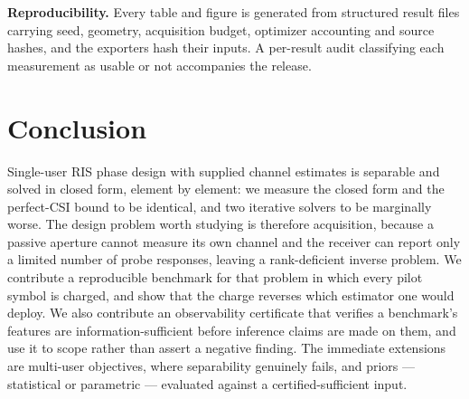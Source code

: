 \documentclass[journal]{IEEEtran}
\begin{document}
\textbf{Reproducibility.} Every table and figure is generated from structured result files carrying seed, geometry, acquisition budget, optimizer accounting and source hashes, and the exporters hash their inputs. A per-result audit classifying each measurement as usable or not accompanies the release.

\section{Conclusion}
\label{sec:conc}

Single-user RIS phase design with supplied channel estimates is separable and solved in closed form, element by element: we measure the closed form and the perfect-CSI bound to be identical, and two iterative solvers to be marginally worse. The design problem worth studying is therefore acquisition, because a passive aperture cannot measure its own channel and the receiver can report only a limited number of probe responses, leaving a rank-deficient inverse problem. We contribute a reproducible benchmark for that problem in which every pilot symbol is charged, and show that the charge reverses which estimator one would deploy. We also contribute an observability certificate that verifies a benchmark's features are information-sufficient before inference claims are made on them, and use it to scope rather than assert a negative finding. The immediate extensions are multi-user objectives, where separability genuinely fails, and priors --- statistical or parametric --- evaluated against a certified-sufficient input.
\end{document}
